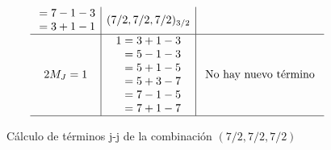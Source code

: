 \begin{figure}[H]
\begin{center}
\begin{align*}
\begin{array}{c | c | c}
\begin{aligned}
        &= 7 - 1 - 3\\ 
        &= 3 + 1 - 1\\ 
        \end{aligned} & (7/2,7/2,7/2)_{3/2}\\
        \hline 
    2M_{J} = 1 & \begin{aligned}
      1 &= 3 + 1 - 3\\ 
        &= 5 - 1 - 3\\ 
        &= 5 + 1 - 5\\ 
        &= 5 + 3 - 7\\ 
        &= 7 - 1 - 5\\
        &= 7 + 1 - 7\\
        \end{aligned} & \text{ No hay nuevo término }\\
        \hline 
\end{array}
    \end{align*}
  \end{center}
  \caption{Cálculo de términos j-j de la combinación $(7/2,7/2,7/2)$}\label{fig: calculo de los terminos j-j de los 3 electrones equivalentes con j = 7/2}
\end{figure}

